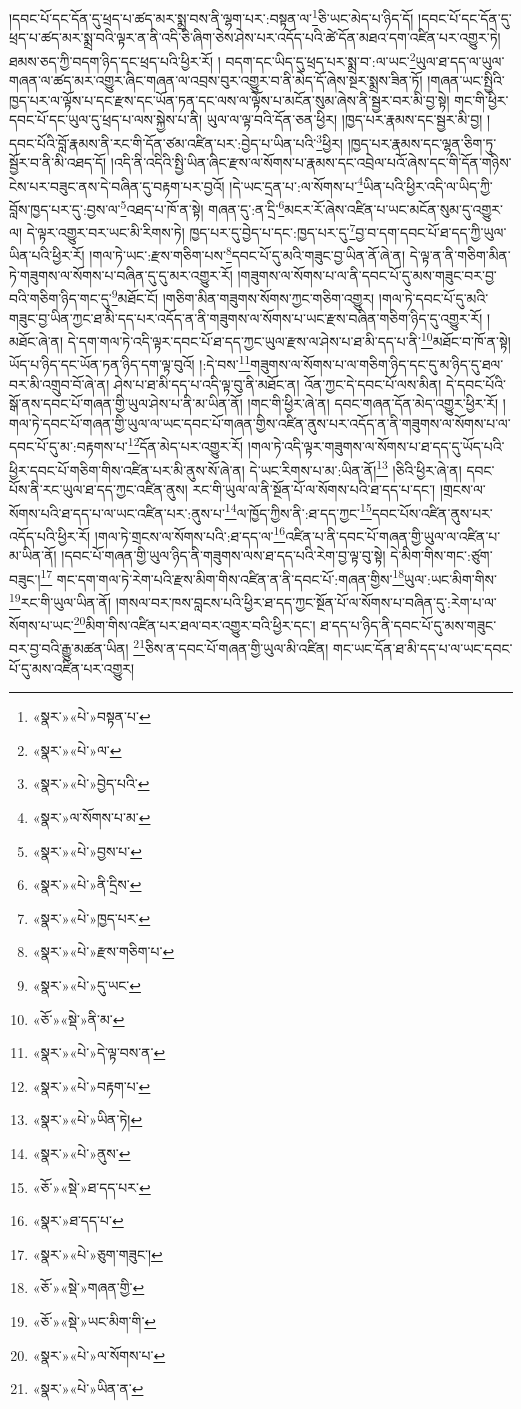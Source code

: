 །དབང་པོ་དང་དོན་དུ་ཕྲད་པ་ཚད་མར་སྨྲ་བས་ནི་ལྷག་པར་:བསྟན་ལ་\footnote{«སྣར་»«པེ་»བསྟན་པ་}ཅི་ཡང་མེད་པ་ཉིད་དོ། །དབང་པོ་དང་དོན་དུ་ཕྲད་པ་ཚད་མར་སྨྲ་བའི་ལྟར་ན་ནི་འདི་ཅི་ཞིག་ཅེས་ཤེས་པར་འདོད་པའི་ཚེ་དོན་མཐའ་དག་འཛིན་པར་འགྱུར་ཏེ། ཐམས་ཅད་ཀྱི་བདག་ཉིད་དང་ཕྲད་པའི་ཕྱིར་རོ། །
བདག་དང་ཡིད་དུ་ཕྲད་པར་སྨྲ་བ་:ལ་ཡང་\footnote{«སྣར་»«པེ་»ལ་}ཡུལ་ཐ་དད་ལ་ཡུལ་གཞན་ལ་ཚད་མར་འགྱུར་ཞིང་གཞན་ལ་འབྲས་བུར་འགྱུར་བ་ནི་མེད་དོ་ཞེས་སྔར་སྨྲས་ཟིན་ཏོ། །གཞན་ཡང་སྤྱིའི་ཁྱད་པར་ལ་ལྟོས་པ་དང་རྫས་དང་ཡོན་ཏན་དང་ལས་ལ་ལྟོས་པ་མངོན་སུམ་ཞེས་ནི་སྦྱར་བར་མི་བྱ་སྟེ། གང་གི་ཕྱིར་དབང་པོ་དང་ཡུལ་དུ་ཕྲད་པ་ལས་སྐྱེས་པ་ནི། ཡུལ་ལ་ལྟ་བའི་དོན་ཅན་ཕྱིར། །ཁྱད་པར་རྣམས་དང་སྦྱར་མི་བྱ། །དབང་པོའི་བློ་རྣམས་ནི་རང་གི་དོན་ཙམ་འཛིན་པར་:བྱེད་པ་ཡིན་པའི་\footnote{«སྣར་»«པེ་»བྱེད་པའི་}ཕྱིར། །ཁྱད་པར་རྣམས་དང་ལྷན་ཅིག་ཏུ་སྦྱོར་བ་ནི་མི་འཐད་དོ། །འདི་ནི་འདིའི་སྤྱི་ཡིན་ཞིང་རྫས་ལ་སོགས་པ་རྣམས་དང་འབྲེལ་པའོ་ཞེས་དང་གི་དོན་གཉིས་ངེས་པར་བཟུང་ནས་དེ་བཞིན་དུ་བརྟག་པར་བྱའོ། །དེ་ཡང་དྲན་པ་:ལ་སོགས་པ་\footnote{«སྣར་»ལ་སོགས་པ་མ་}ཡིན་པའི་ཕྱིར་འདི་ལ་ཡིད་ཀྱི་བློས་ཁྱད་པར་དུ་:བྱས་ལ་\footnote{«སྣར་»«པེ་»བྱས་པ་}འཐད་པ་ཁོ་ན་སྟེ། གཞན་དུ་:ན་དྲི་\footnote{«སྣར་»«པེ་»ནི་དྲིས་}མངར་རོ་ཞེས་འཛིན་པ་ཡང་མངོན་སུམ་དུ་འགྱུར་ལ། དེ་ལྟར་འགྱུར་བར་ཡང་མི་རིགས་ཏེ། ཁྱད་པར་དུ་བྱེད་པ་དང་:ཁྱད་པར་དུ་\footnote{«སྣར་»«པེ་»ཁྱད་པར་}བྱ་བ་དག་དབང་པོ་ཐ་དད་ཀྱི་ཡུལ་ཡིན་པའི་ཕྱིར་རོ། །གལ་ཏེ་ཡང་:རྫས་གཅིག་པས་\footnote{«སྣར་»«པེ་»རྫས་གཅིག་པ་}དབང་པོ་དུ་མའི་གཟུང་བྱ་ཡིན་ནོ་ཞེ་ན། དེ་ལྟ་ན་ནི་གཅིག་མིན་ཏེ་གཟུགས་ལ་སོགས་པ་བཞིན་དུ་དུ་མར་འགྱུར་རོ། །གཟུགས་ལ་སོགས་པ་ལ་ནི་དབང་པོ་དུ་མས་གཟུང་བར་བྱ་བའི་གཅིག་ཉིད་གང་དུ་\footnote{«སྣར་»«པེ་»དུ་ཡང་}མཐོང་ངོ། །གཅིག་མིན་གཟུགས་སོགས་ཀྱང་གཅིག་འགྱུར། །གལ་ཏེ་དབང་པོ་དུ་མའི་གཟུང་བྱ་ཡིན་ཀྱང་ཐ་མི་དད་པར་འདོད་ན་ནི་གཟུགས་ལ་སོགས་པ་ཡང་རྫས་བཞིན་གཅིག་ཉིད་དུ་འགྱུར་རོ། །མཐོང་ཞེ་ན། དེ་དག་གལ་ཏེ་འདི་ལྟར་དབང་པོ་ཐ་དད་ཀྱང་ཡུལ་རྫས་ལ་ཤེས་པ་ཐ་མི་དད་པ་ནི་\footnote{«ཅོ་»«སྡེ་»ནི་མ་}མཐོང་བ་ཁོ་ན་སྟེ། ཡོད་པ་ཉིད་དང་ཡོན་ཏན་ཉིད་དག་ལྟ་བུའོ། །:དེ་བས་\footnote{«སྣར་»«པེ་»དེ་ལྟ་བས་ན་}གཟུགས་ལ་སོགས་པ་ལ་གཅིག་ཉིད་དང་དུ་མ་ཉིད་དུ་ཐལ་བར་མི་འགྲུབ་བོ་ཞེ་ན། ཤེས་པ་ཐ་མི་དད་པ་འདི་ལྟ་བུ་ནི་མཐོང་ན། འོན་ཀྱང་དེ་དབང་པོ་ལས་མིན། དེ་དབང་པོའི་སྒོ་ནས་དབང་པོ་གཞན་གྱི་ཡུལ་ཤེས་པ་ནི་མ་ཡིན་ནོ། །གང་གི་ཕྱིར་ཞེ་ན། དབང་གཞན་དོན་མེད་འགྱུར་ཕྱིར་རོ། །གལ་ཏེ་དབང་པོ་གཞན་གྱི་ཡུལ་ལ་ཡང་དབང་པོ་གཞན་གྱིས་འཛིན་ནུས་པར་འདོད་ན་ནི་གཟུགས་ལ་སོགས་པ་ལ་དབང་པོ་དུ་མ་:བརྟགས་པ་\footnote{«སྣར་»«པེ་»བརྟག་པ་}དོན་མེད་པར་འགྱུར་རོ། །གལ་ཏེ་འདི་ལྟར་གཟུགས་ལ་སོགས་པ་ཐ་དད་དུ་ཡོད་པའི་ཕྱིར་དབང་པོ་གཅིག་གིས་འཛིན་པར་མི་ནུས་སོ་ཞེ་ན། དེ་ཡང་རིགས་པ་མ་:ཡིན་ནོ།\footnote{«སྣར་»«པེ་»ཡིན་ཏེ།} །ཅིའི་ཕྱིར་ཞེ་ན། དབང་པོས་ནི་རང་ཡུལ་ཐ་དད་ཀྱང་འཛིན་ནུས། རང་གི་ཡུལ་ལ་ནི་སྔོན་པོ་ལ་སོགས་པའི་ཐ་དད་པ་དང་། །གྲངས་ལ་སོགས་པའི་ཐ་དད་པ་ལ་ཡང་འཛིན་པར་:ནུས་པ་\footnote{«སྣར་»«པེ་»ནུས་}ལ་ཁྱོད་ཀྱིས་ནི་:ཐ་དད་ཀྱང་\footnote{«ཅོ་»«སྡེ་»ཐ་དད་པར་}དབང་པོས་འཛིན་ནུས་པར་འདོད་པའི་ཕྱིར་རོ། །གལ་ཏེ་གྲངས་ལ་སོགས་པའི་:ཐ་དད་ལ་\footnote{«སྣར་»ཐ་དད་པ་}འཛིན་པ་ནི་དབང་པོ་གཞན་གྱི་ཡུལ་ལ་འཛིན་པ་མ་ཡིན་ནོ། །དབང་པོ་གཞན་གྱི་ཡུལ་ཉིད་ནི་གཟུགས་ལས་ཐ་དད་པའི་རེག་བྱ་ལྟ་བུ་སྟེ། དེ་མིག་གིས་གང་:ཙུག་བཟུང་།\footnote{«སྣར་»«པེ་»ཅུག་གཟུང་།} གང་དག་གལ་ཏེ་རེག་པའི་རྫས་མིག་གིས་འཛིན་ན་ནི་དབང་པོ་:གཞན་གྱིས་\footnote{«ཅོ་»«སྡེ་»གཞན་གྱི་}ཡུལ་:ཡང་མིག་གིས་\footnote{«ཅོ་»«སྡེ་»ཡང་མིག་གི་}རང་གི་ཡུལ་ཡིན་ནོ། །གསལ་བར་ཁས་བླངས་པའི་ཕྱིར་ཐ་དད་ཀྱང་སྔོན་པོ་ལ་སོགས་པ་བཞིན་དུ་:རེག་པ་ལ་སོགས་པ་ཡང་\footnote{«སྣར་»«པེ་»ལ་སོགས་པ་}མིག་གིས་འཛིན་པར་ཐལ་བར་འགྱུར་བའི་ཕྱིར་དང་། ཐ་དད་པ་ཉིད་ནི་དབང་པོ་དུ་མས་གཟུང་བར་བྱ་བའི་རྒྱུ་མཚན་ཡིན། \footnote{«སྣར་»«པེ་»ཡིན་ན་}ཅིས་ན་དབང་པོ་གཞན་གྱི་ཡུལ་མི་འཛིན། གང་ཡང་དོན་ཐ་མི་དད་པ་ལ་ཡང་དབང་པོ་དུ་མས་འཛིན་པར་འགྱུར། 